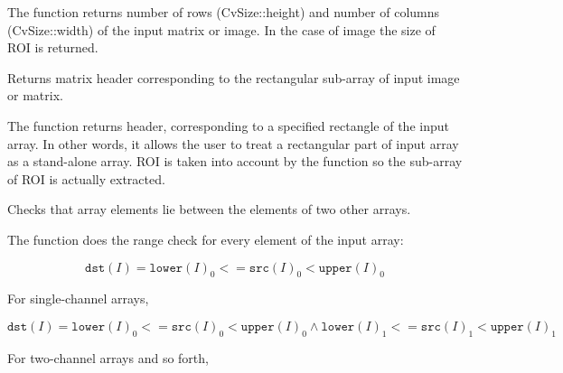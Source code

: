 \begin{description}
\end{description}

The function returns number of rows (CvSize::height) and number of columns (CvSize::width) of the input matrix or image. In the case of image the size of ROI is returned.


Returns matrix header corresponding to the rectangular sub-array of input image or matrix.


\begin{description}
\ifC
{}
\fi
{}
\end{description}

The function returns header, corresponding to
a specified rectangle of the input array. In other words, it allows
the user to treat a rectangular part of input array as a stand-alone
array. ROI is taken into account by the function so the sub-array of
ROI is actually extracted.

Checks that array elements lie between the elements of two other arrays.


\begin{description}
\end{description}


The function does the range check for every element of the input array:

\[
\texttt{dst}(I)=\texttt{lower}(I)_0 <= \texttt{src}(I)_0 < \texttt{upper}(I)_0
\]

For single-channel arrays,

\[
\texttt{dst}(I)=
\texttt{lower}(I)_0 <= \texttt{src}(I)_0 < \texttt{upper}(I)_0 \land
\texttt{lower}(I)_1 <= \texttt{src}(I)_1 < \texttt{upper}(I)_1
\]

For two-channel arrays and so forth,

